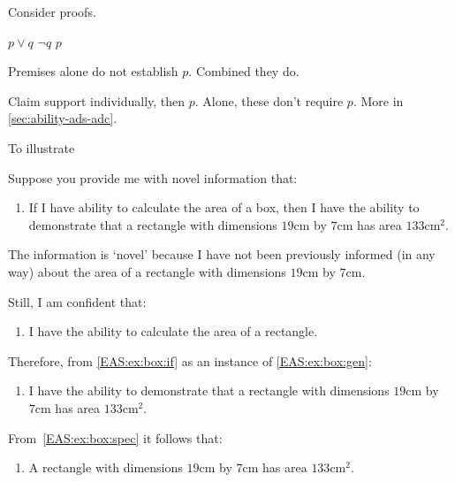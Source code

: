 \begin{note}
  Consider proofs.

  \(p \lor q\)
  \(\lnot q\)
  \(p\)

  Premises alone do not establish \(p\).
  Combined they do.

  Claim support individually, then \(p\).
  Alone, these don't require \(p\).
  More in \autoref{sec:ability-ads-adc}.
\end{note}

\begin{note}
  To illustrate \EAS{}

  \begin{illustration}\label{ill:rectangle:ability}
    Suppose you provide me with novel information that:
    \begin{enumerate}[label=\emph{A}\arabic*., ref=(\emph{A}\arabic*), series=EAS_counter]
    \item\label{EAS:ex:box:if} If I have ability to calculate the area of a box, then I have the ability to demonstrate that a rectangle with dimensions \(19\text{cm}\) by \(7\text{cm}\) has area \(133\text{cm}^{2}\).
    \end{enumerate}
    The information is `novel' because I have not been previously informed (in any way) about the area of a rectangle with dimensions \(19\text{cm}\) by \(7\text{cm}\).

    Still, I am confident that:
    \begin{enumerate}[label=\emph{A}\arabic*., ref=(\emph{A}\arabic*), resume*=EAS_counter]
    \item\label{EAS:ex:box:gen} I have the ability to calculate the area of a rectangle.
    \end{enumerate}
    Therefore, from \ref{EAS:ex:box:if} as an instance of \ref{EAS:ex:box:gen}:
    \begin{enumerate}[label=\emph{A}\arabic*., ref=(\emph{A}\arabic*), resume*=EAS_counter]
    \item\label{EAS:ex:box:spec} I have the ability to demonstrate that a rectangle with dimensions \(19\text{cm}\) by \(7\text{cm}\) has area \(133\text{cm}^{2}\).
    \end{enumerate}
    From~\ref{EAS:ex:box:spec} it follows that:
    \begin{enumerate}[label=\emph{A}\arabic*., ref=(\emph{A}\arabic*), resume*=EAS_counter]
    \item\label{EAS:ex:box:fact} A rectangle with dimensions \(19\text{cm}\) by \(7\text{cm}\) has area \(133\text{cm}^{2}\).
    \end{enumerate}
  \end{illustration}


\end{note}
